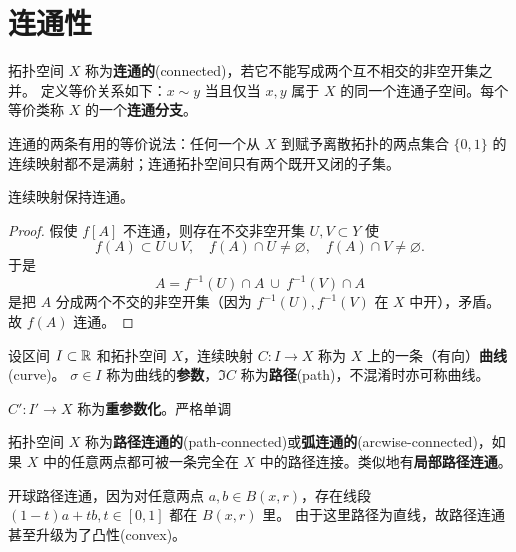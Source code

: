 \section{连通性}

\begin{definition}
    拓扑空间 $X$ 称为\textbf{连通的}(connected)，若它不能写成两个互不相交的非空开集之并。
    定义等价关系如下：$x \sim y$ 当且仅当 $x,y$ 属于 $X$ 的同一个连通子空间。每个等价类称 $X$ 的一个\textbf{连通分支}。
\end{definition}
\begin{theorem}
    连通的两条有用的等价说法：任何一个从 $X$ 到赋予离散拓扑的两点集合 $\{0,1\}$ 的连续映射都不是满射；连通拓扑空间只有两个既开又闭的子集。
\end{theorem}

\begin{theorem}
    连续映射保持连通。
\end{theorem}
\begin{proof}
假使 $f[A]$ 不连通，则存在不交非空开集 $U,V\subset Y$ 使
\[
f(A)\subset U\cup V,\quad f(A)\cap U\ne\varnothing,\quad f(A)\cap V\ne\varnothing.
\]
于是
\[
A = f^{-1}(U)\cap A\ \cup\ f^{-1}(V)\cap A
\]
是把 $A$ 分成两个不交的非空开集（因为 $f^{-1}(U), f^{-1}(V)$ 在 $X$ 中开），矛盾。故 $f(A)$ 连通。
\end{proof}

\begin{definition}
    设区间 $I\subset\mathbb{R}$ 和拓扑空间 $X$，连续映射 $C:I\to X$ 称为 $X$ 上的一条（有向）\textbf{曲线}(curve)。
    $\sigma\in I$ 称为曲线的\textbf{参数}，$\Im C$ 称为\textbf{路径}(path)，不混淆时亦可称曲线。
\end{definition}

\begin{definition}
    $C':I'\to X$ 称为\textbf{重参数化}。严格单调
\end{definition}

\begin{definition}
    拓扑空间 $X$ 称为\textbf{路径连通的}(path-connected)或\textbf{弧连通的}(arcwise-connected)，如果 $X$ 中的任意两点都可被一条完全在 $X$ 中的路径连接。类似地有\textbf{局部路径连通}。
\end{definition}

\begin{example}
    开球路径连通，因为对任意两点 $a,b\in B(x,r)$，存在线段
 $(1-t)a+tb,t\in[0,1]$ 都在 $B(x,r)$ 里。
 由于这里路径为直线，故路径连通甚至升级为了凸性(convex)。
\end{example}

